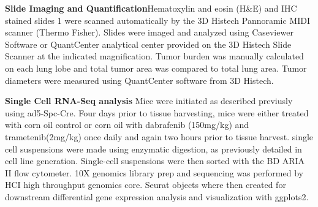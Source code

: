\textbf{Slide Imaging and Quantification}Hematoxylin and eosin (H\&E) and IHC stained slides 1 were scanned automatically by the 3D Histech Pannoramic MIDI scanner (Thermo Fisher). Slides were imaged and analyzed using Caseviewer Software or QuantCenter analytical center provided on the 3D Histech Slide Scanner at the indicated magnification. Tumor burden was manually calculated on each lung lobe and total tumor area was compared to total lung area. Tumor diameters were measured using QuantCenter software from 3D Histech.

\textbf{Single Cell RNA-Seq analysis} Mice were initiated as described previusly using ad5-Spc-Cre. Four days prior to tissue harvesting, mice were either treated with corn oil control or corn oil with dabrafenib (150mg/kg) and trametenib(2mg/kg) once daily and again two hours prior to tissue harvest. single cell suspensions were made using enzymatic digestion, as previously detailed in cell line generation. Single-cell suspensions were then sorted with the BD ARIA II flow cytometer. 10X genomics library prep and sequencing was performed by HCI high throughput genomics core. Seurat objects where then created for downstream differential gene expression analysis and visualization with ggplots2.


